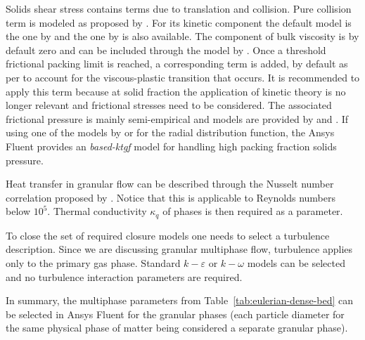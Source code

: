 Solids shear stress contains terms due to translation and collision. Pure collision term is modeled as proposed by \textcite{Gidaspow1992}. For its kinetic component the default model is the one by \textcite{Syamlal1993} and the one by \textcite{Gidaspow1992} is also available. The component of bulk viscosity  is by default zero and can be included through the model by \textcite{Lun1984}. Once a threshold frictional packing limit is reached, a corresponding term is added, by default as per \textcite{Schaeffer1987} to account for the viscous-plastic transition that occurs. It is recommended to apply this term because at solid fraction the application of kinetic theory is no longer relevant and frictional stresses need to be considered. The associated frictional pressure is mainly semi-empirical and models are provided by \textcite{Johnson1987} and \textcite{Syamlal1993}. If using one of the models by \textcite{Lun1984} or \textcite{Gidaspow1992} for the radial distribution function, the Ansys Fluent provides an \emph{based-ktgf} model for handling high packing fraction solids pressure.
 
Heat transfer in granular flow can be described through the Nusselt number correlation proposed by \textcite{Gunn1978}. Notice that this is applicable to Reynolds numbers below $10^5$. Thermal conductivity $\kappa_q$ of phases is then required as a parameter.

To close the set of required closure models one needs to select a turbulence description. Since we are discussing granular multiphase flow, turbulence applies only to the primary gas phase. Standard $k-\varepsilon$ or $k-\omega$ models can be selected and no turbulence interaction parameters are required.

In summary, the multiphase parameters from Table~\ref{tab:eulerian-dense-bed} can be selected in Ansys Fluent for the granular phases (each particle diameter for the same physical phase of matter being considered a separate granular phase).

